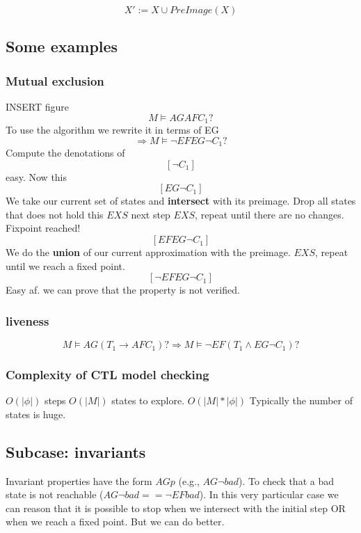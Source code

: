 \documentclass[11pt]{article}
\begin{document}
$$
	X' := X \cup PreImage(X)
$$




\subsection{Some examples} %
\label{sub:some_examples}
\subsubsection{Mutual exclusion} %
\label{ssub:mutual_exclusion}
INSERT figure
\[
	M \models AGAF C_1 ?
\]
To use the algorithm we rewrite it in terms of EG
\[
	\Rightarrow M \models \lnot EFEG \lnot C_1 ?
\]
Compute the denotations of 
\[
	[\lnot C_1]
\]
easy. Now this
\[
	[EG \lnot C_1]
\]
We take our current set of states and \textbf{intersect} with its preimage. Drop all states that does not hold this $EX  S$ next step $EX S$, repeat until there are no changes. Fixpoint reached!
\[
	[EFEG \lnot C_1]
\]
We do the \textbf{union} of our current approximation with the preimage. $EX S$, repeat until we reach a fixed point.
\[
	[\lnot EFEG \lnot C_1]
\]
Easy af. we can prove that the property is not verified.


\subsubsection{liveness} %
\label{ssub:liveness}
\[
	M \models AG(T_1 \rightarrow AF C_1)? \Rightarrow M \models \lnot EF (T_1 \land EG \lnot C_1)?
\]

\subsubsection{Complexity of CTL model checking} %
\label{ssub:complexity_of_ctl_model_checking}
$O(|\phi|)$ steps $O(|M|)$ states to explore. $O(|M| * |\phi|)$
Typically the number of states is huge.



\subsection{Subcase: invariants} %
\label{sub:subcase_invariants}
Invariant properties have the form $AG p$ (e.g., $AG \lnot bad$). To check that a bad state is not reachable ($AG \lnot bad == \lnot EF bad$).
In this very particular case we can reason that it is possible to stop when we intersect with the initial step OR when we reach a fixed point. But we can do better.
\end{document}
